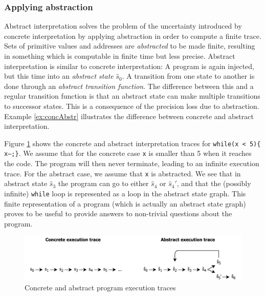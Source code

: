 \subsubsection*{Applying abstraction}
Abstract interpretation solves the problem of the uncertainty introduced by concrete interpretation by applying abstraction in order to compute a finite trace. Sets of primitive values and addresses are \textit{abstracted} to be made finite, resulting in something which is computable in finite time but less precise. Abstract interpretation is similar to concrete interpretation: A program is again injected, but this time into an \textit{abstract state} $\hat{s}_0$. A transition from one state to another is done through an \textit{abstract transition function}. The difference between this and a regular transition function is that an abstract state can make multiple transitions to successor states. This is a consequence of the precision loss due to abstraction. Example \ref{ex:concAbstr} illustrates the difference between concrete and abstract interpretation.

\begin{exmp}
\label{ex:concAbstr}
Figure \ref{fig:abstractInterpretation} shows the concrete and abstract interpretation traces for \texttt{while(x < 5)\{ x--;\}}. We assume that for the concrete case \texttt{x} is smaller than 5 when it reaches the code. The program will then never terminate, leading to an infinite execution trace. For the abstract case, we assume that \texttt{x} is abstracted. We see that in abstract state $\hat{s}_3$ the program can go to either $\hat{s}_4$ or $\hat{s}_{4}'$, and that the (possibly infinite) \texttt{while} loop is represented as a loop in the abstract state graph. This finite representation of a program (which is actually an abstract state graph) proves to be useful to provide answers to non-trivial questions about the program.

\begin{figure}[!h]
    \centering
      \includegraphics[width=1.0\textwidth]{images/abstractInterpretation} 
      \caption{Concrete and abstract program execution traces}
    \label{fig:abstractInterpretation}
\end{figure}

\end{exmp}


